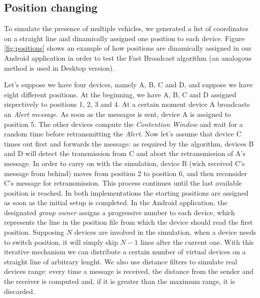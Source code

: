 \subsection{Position changing}
\label{sec:position_change}

To simulate the presence of multiple vehicles, we generated a list of coordinates on a straight line and dinamically assigned one position to each device. Figure \ref{fig:positions} shows an example of how positions are dinamically assigned in our Android application in order to test the Fast Broadcast algorithm (an analogous method is used in Desktop version).

Let's suppose we have four devices, namely A, B, C and D, and suppose we have eight different positions. At the beginning, we have A, B, C and D assigned rispectively to positions 1, 2, 3 and 4. At a certain moment device A broadcasts an \emph{Alert message}. As soon as the messages is sent, device A is assigned to position 5. The other devices compute the \textit{Contention Window} and wait for a random time before retransmitting the \emph{Alert}. Now let's assume that device C times out first and forwards the message: as required by the algorithm, devices B and D will detect the transmission from C and abort the retransmission of A's message. In order to carry on with the simulation, device B (wich received C's message from behind) moves from position 2 to position 6, and then reconsider C's message for retransmission. This process continues until the last available position is reached.
In both implementations the starting positions are assigned as soon as the initial setup is completed. In the Android application, the designated \textit{group owner} assigns a progressive number to each device, which represents the line in the position file from which the device should read the first position. Supposing $N$ devices are involved in the simulation, when a device needs to switch position, it will simply skip $N-1$ lines after the current one.
With this iterative mechanism we can distribute a certain number of virtual devices on a straight line of arbitrary lenght. 
We also use distance filters to simulate real devices range: every time a message is received, the distance from the sender and the receiver is computed and, if it is greater than the maximum range, it is discarded.

